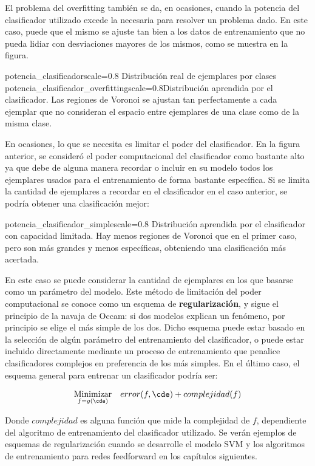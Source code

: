 El problema del overfitting también se da, en ocasiones, cuando la potencia del clasificador utilizado excede la necesaria para resolver un problema dado. En este caso, puede que el mismo se ajuste tan bien a los datos de entrenamiento que no pueda lidiar con desviaciones mayores de los mismos, como se muestra en la figura.


\tikzimagetwo
{potencia_clasificador}{scale=0.8}{ Distribución real de ejemplares por clases}
{potencia_clasificador_overfitting}{scale=0.8}{Distribución aprendida por el clasificador. Las regiones de Voronoi se ajustan tan perfectamente a cada ejemplar que no consideran el espacio entre ejemplares de una clase como de la misma clase.}


En ocasiones, lo que se necesita es limitar el poder del clasificador. En la figura anterior, se consideró el poder computacional del clasificador como bastante alto ya que debe de alguna manera recordar o incluir en su modelo todos los ejemplares usados para el entrenamiento de forma bastante específica. Si se limita la cantidad de ejemplares a recordar en el clasificador en el caso anterior, se podría obtener una clasificación mejor:

\tikzimage
{potencia_clasificador_simple}{scale=0.8}{ Distribución aprendida por el clasificador con capacidad limitada. Hay menos regiones de Voronoi que en el primer caso, pero son más grandes y menos específicas, obteniendo una clasificación más acertada.}

En este caso se puede considerar la cantidad de ejemplares en los que basarse como un parámetro del modelo. Este método de limitación del poder computacional se conoce como un esquema de \textbf{regularización}, y sigue el principio de la navaja de Occam: si dos modelos explican un fenómeno, por principio se elige el más simple de los dos. Dicho esquema puede estar basado en la selección de algún parámetro del entrenamiento del clasificador, o puede estar incluido directamente mediante un proceso de entrenamiento que penalice clasificadores complejos en preferencia de los más simples. En el último caso, el esquema general para entrenar un clasificador podría ser:

\begin{equation*}
\begin{aligned}
\underset{f=g(\cde)}{\text{Minimizar}} & & error(f,\cde) + complejidad(f) 
\end{aligned}
\end{equation*}

Donde $complejidad$ es alguna función que mide la complejidad de $f$, dependiente del algoritmo de entrenamiento del clasificador utilizado. Se verán ejemplos de esquemas de regularización cuando se desarrolle el modelo SVM y los algoritmos de entrenamiento para redes feedforward en los capítulos siguientes.

